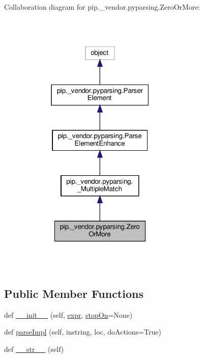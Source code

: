 Collaboration diagram for pip.\+\_\+vendor.\+pyparsing.\+Zero\+Or\+More\+:
\nopagebreak
\begin{figure}[H]
\begin{center}
\leavevmode
\includegraphics[width=223pt]{classpip_1_1__vendor_1_1pyparsing_1_1ZeroOrMore__coll__graph}
\end{center}
\end{figure}
\subsection*{Public Member Functions}
\begin{DoxyCompactItemize}
\item 
def \hyperlink{classpip_1_1__vendor_1_1pyparsing_1_1ZeroOrMore_afe89075c5a720dcbdf81cb5d6a72880f}{\+\_\+\+\_\+init\+\_\+\+\_\+} (self, \hyperlink{classpip_1_1__vendor_1_1pyparsing_1_1ParseElementEnhance_af574b49a0a7d914693fdaa833df7098f}{expr}, \hyperlink{classpip_1_1__vendor_1_1pyparsing_1_1__MultipleMatch_a5a7b5259d96f04d1ffbc448715239798}{stop\+On}=None)
\item 
def \hyperlink{classpip_1_1__vendor_1_1pyparsing_1_1ZeroOrMore_ae26caf1006b505bc4717d2b11747bd35}{parse\+Impl} (self, instring, loc, do\+Actions=True)
\item 
def \hyperlink{classpip_1_1__vendor_1_1pyparsing_1_1ZeroOrMore_ac1562a2b5c811ee36533adedc4d8d637}{\+\_\+\+\_\+str\+\_\+\+\_\+} (self)
\end{DoxyCompactItemize}

